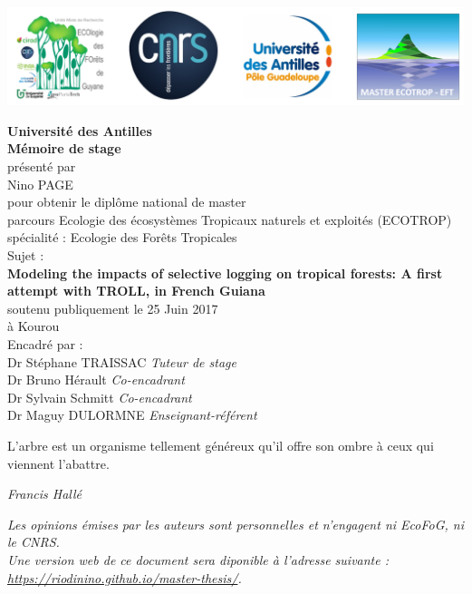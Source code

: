\includegraphics{images/logos}

\begin{center}
\Large{\textbf{Université des Antilles}} \\
  \LARGE{\textbf{Mémoire de stage}} \\
  \vspace*{\fill}
  \large{présenté par} \\
  \large{Nino PAGE} \\
  \vspace*{\fill}
  \large{pour obtenir le diplôme national de master} \\
  \large{parcours Ecologie des écosystèmes Tropicaux naturels et exploités (ECOTROP)} \\
  \small{spécialité : Ecologie des Forêts Tropicales} \\
  \vspace*{\fill}
  \large{Sujet :} \\
  \Large{\textbf{Modeling the impacts of selective logging on tropical forests: A first attempt with TROLL, in French Guiana}} \\
  \vspace*{\fill}
  \large{soutenu publiquement le 25 Juin 2017} \\
  \large{à Kourou} \\
  \vspace*{\fill}
  \large{Encadré par :} \\
  \vspace*{\fill}
  Dr Stéphane TRAISSAC  \emph{Tuteur de stage} \\
  Dr Bruno Hérault  \emph{Co-encadrant} \\
  Dr Sylvain Schmitt  \emph{Co-encadrant} \\
  Dr Maguy DULORMNE  \emph{Enseignant-référent} \\
\end{center}

\newpage
\vspace*{\fill}
\epigraph{L\textquoteright arbre est un organisme tellement généreux qu’il offre son ombre à ceux qui viennent l\textquoteright abattre.}{\textit{Francis Hallé}}
\vspace*{\fill}
\emph{Les opinions émises par les auteurs sont personnelles et n'engagent ni EcoFoG, ni le CNRS.}\\
\emph{Une version web de ce document sera diponible à l'adresse suivante : \url{https://riodinino.github.io/master-thesis/}.}
\newpage
